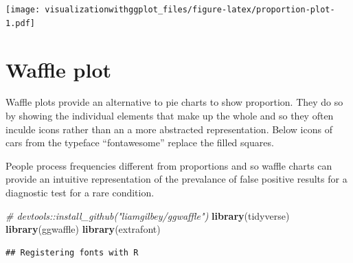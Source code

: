 \documentclass[]{krantz}
\makeatletter
\newenvironment{Shaded}{\begin{snugshade}}{\end{snugshade}}
\newcommand{\CommentTok}[1]{\textcolor[rgb]{0.56,0.35,0.01}{\textit{#1}}}
\newcommand{\KeywordTok}[1]{\textcolor[rgb]{0.13,0.29,0.53}{\textbf{#1}}}
\newcommand{\NormalTok}[1]{#1}
\newenvironment{kframe}{%
\medskip{}
\setlength{\fboxsep}{.8em}
 \def\at@end@of@kframe{}%
 \ifinner\ifhmode%
  \def\at@end@of@kframe{\end{minipage}}%
  \begin{minipage}{\columnwidth}%
 \fi\fi%
 \def\FrameCommand##1{\hskip\@totalleftmargin \hskip-\fboxsep
 \colorbox{shadecolor}{##1}\hskip-\fboxsep
     \hskip-\linewidth \hskip-\@totalleftmargin \hskip\columnwidth}%
 \MakeFramed {\advance\hsize-\width
   \@totalleftmargin\z@ \linewidth\hsize
   \@setminipage}}%
 {\par\unskip\endMakeFramed%
 \at@end@of@kframe}
\renewenvironment{Shaded}{\begin{kframe}}{\end{kframe}}
\makeatother
\begin{document}
\texttt{[image: visualizationwithggplot\_files/figure-latex/proportion-plot-1.pdf]}

\hypertarget{waffle-plot}{%
\section{Waffle plot}\label{waffle-plot}}

Waffle plots provide an alternative to pie charts to show proportion. They do so by showing the individual elements that make up the whole and so they often inculde icons rather than an a more abstracted representation. Below icons of cars from the typeface ``fontawesome'' replace the filled squares.

People process frequencies different from proportions and so waffle charts can provide an intuitive representation of the prevalance of false positive results for a diagnostic test for a rare condition.

\begin{Shaded}
\begin{Highlighting}[]
\CommentTok{# devtools::install_github("liamgilbey/ggwaffle")}
\KeywordTok{library}\NormalTok{(tidyverse)}
\KeywordTok{library}\NormalTok{(ggwaffle)}
\KeywordTok{library}\NormalTok{(extrafont)}
\end{Highlighting}
\end{Shaded}

\begin{verbatim}
## Registering fonts with R
\end{verbatim}
\end{document}
